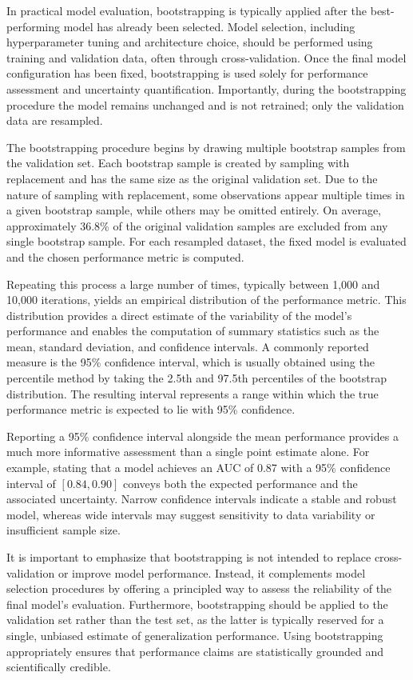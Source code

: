 \documentclass[en]{dimscthesis}
\begin{document}
In practical model evaluation, bootstrapping is typically applied after the best-performing model has already been selected. Model selection, including hyperparameter tuning and architecture choice, should be performed using training and validation data, often through cross-validation. Once the final model configuration has been fixed, bootstrapping is used solely for performance assessment and uncertainty quantification. Importantly, during the bootstrapping procedure the model remains unchanged and is not retrained; only the validation data are resampled.

The bootstrapping procedure begins by drawing multiple bootstrap samples from the validation set. Each bootstrap sample is created by sampling with replacement and has the same size as the original validation set. Due to the nature of sampling with replacement, some observations appear multiple times in a given bootstrap sample, while others may be omitted entirely. On average, approximately 36.8\% of the original validation samples are excluded from any single bootstrap sample. For each resampled dataset, the fixed model is evaluated and the chosen performance metric is computed.

Repeating this process a large number of times, typically between 1,000 and 10,000 iterations, yields an empirical distribution of the performance metric. This distribution provides a direct estimate of the variability of the model’s performance and enables the computation of summary statistics such as the mean, standard deviation, and confidence intervals. A commonly reported measure is the 95\% confidence interval, which is usually obtained using the percentile method by taking the 2.5th and 97.5th percentiles of the bootstrap distribution. The resulting interval represents a range within which the true performance metric is expected to lie with 95\% confidence.

Reporting a 95\% confidence interval alongside the mean performance provides a much more informative assessment than a single point estimate alone. For example, stating that a model achieves an AUC of 0.87 with a 95\% confidence interval of $[0.84, 0.90]$ conveys both the expected performance and the associated uncertainty. Narrow confidence intervals indicate a stable and robust model, whereas wide intervals may suggest sensitivity to data variability or insufficient sample size.

It is important to emphasize that bootstrapping is not intended to replace cross-validation or improve model performance. Instead, it complements model selection procedures by offering a principled way to assess the reliability of the final model’s evaluation. Furthermore, bootstrapping should be applied to the validation set rather than the test set, as the latter is typically reserved for a single, unbiased estimate of generalization performance. Using bootstrapping appropriately ensures that performance claims are statistically grounded and scientifically credible.
\end{document}
